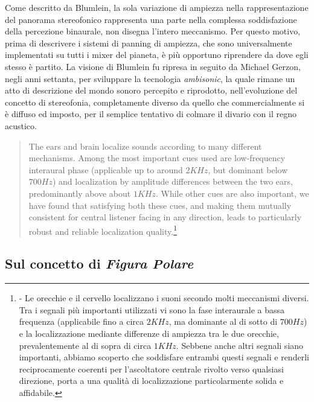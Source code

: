 Come descritto da Blumlein, la sola variazione di ampiezza nella
rappresentazione del panorama stereofonico rappresenta una parte nella complessa
soddisfazione della percezione binaurale, non disegna l'intero meccanismo.
Per questo motivo, prima di descrivere i sistemi di panning di ampiezza, che
sono universalmente implementati su tutti i mixer del pianeta, è più opportuno
riprendere da dove egli stesso è partito. La visione di Blumlein fu ripresa in
seguito da Michael Gerzon, negli anni settanta, per sviluppare la tecnologia
\emph{ambisonic}, la quale rimane un atto di descrizione del mondo sonoro
percepito e riprodotto, nell'evoluzione del concetto di stereofonia, completamente diverso
da quello che commercialmente si è diffuso ed imposto, per il semplice tentativo
di colmare il divario con il regno acustico.

\begin{quote}
The ears and brain localize sounds according to many different mechanisms. Among
the most important cues used are low-frequency interaural phase (applicable up
to around $2KHz$, but dominant below $700Hz$) and localization by
amplitude differences between the two ears, predominantly above about
$1KHz$. While other cues are also important, we have found that satisfying
both these cues, and making them mutually consistent for central listener facing
in any direction, leads to particularly robust and reliable localization
quality.\footnote{\cite{mg92pdmsss} - Le orecchie e il cervello localizzano i
suoni secondo molti meccanismi diversi. Tra i segnali più importanti utilizzati
vi sono la fase interaurale a bassa frequenza (applicabile fino a circa $2KHz$,
ma dominante al di sotto di $700Hz$) e la localizzazione mediante
differenze di ampiezza tra le due orecchie, prevalentemente al di sopra di
circa $1KHz$. Sebbene anche altri segnali siano importanti, abbiamo
scoperto che soddisfare entrambi questi segnali e renderli reciprocamente
coerenti per l'ascoltatore centrale rivolto verso qualsiasi direzione, porta
a una qualità di localizzazione particolarmente solida e affidabile.}
\end{quote}

\subsection{Sul concetto di \emph{Figura Polare}}
\label{sec:polarplot}

